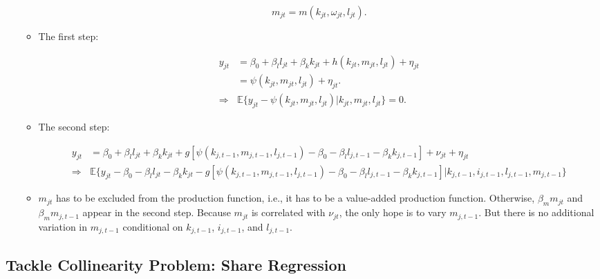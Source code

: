 \documentclass[]{book}
\theoremstyle{definition}
\theoremstyle{definition}
\theoremstyle{definition}
\theoremstyle{remark}
\begin{document}
\begin{enumerate}
\begin{itemize}
    \begin{equation}
    m_{jt} = m(k_{jt}, \omega_{jt}, l_{jt}).
    \end{equation}
  \item
    The first step:

    \begin{equation}
    \begin{split}
    y_{jt} &= \beta_0 + \beta_l l_{jt} + \beta_k k_{jt} + h(k_{jt}, m_{jt}, l_{jt}) + \eta_{jt}\\
    &= \psi(k_{jt}, m_{jt}, l_{jt}) + \eta_{jt}.\\
    \Rightarrow & \mathbb{E}\{y_{jt} - \psi(k_{jt}, m_{jt}, l_{jt})|k_{jt}, m_{jt}, l_{jt}\} = 0.
    \end{split}
    \end{equation}
  \item
    The second step:

    \begin{equation}
    \begin{split}
    y_{jt} &= \beta_0 + \beta_l l_{jt} + \beta_k k_{jt} + g[\psi(k_{j, t - 1}, m_{j, t - 1}, l_{j, t - 1}) - \beta_0 - \beta_l l_{j, t - 1} - \beta_k k_{j, t - 1}] + \nu_{jt} + \eta_{jt}\\
    \Rightarrow & \mathbb{E}\{y_{jt} - \beta_0 - \beta_l l_{jt} - \beta_k k_{jt} - g[\psi(k_{j, t - 1}, m_{j, t - 1}, l_{j, t - 1}) - \beta_0 - \beta_l l_{j, t - 1} - \beta_k k_{j, t - 1}]|k_{j, t - 1}, i_{j, t - 1}, l_{j, t - 1}, m_{j, t - 1}\}
    \end{split}
    \end{equation}
  \item
    \(m_{jt}\) has to be excluded from the production function, i.e., it
    has to be a value-added production function. Otherwise,
    \(\beta_m m_{jt}\) and \(\beta_m m_{j, t - 1}\) appear in the second
    step. Because \(m_{jt}\) is correlated with \(\nu_{jt}\), the only
    hope is to vary \(m_{j, t - 1}\). But there is no additional
    variation in \(m_{j, t - 1}\) conditional on \(k_{j, t - 1}\),
    \(i_{j, t - 1}\), and \(l_{j, t - 1}\).
  \end{itemize}
\end{enumerate}

\subsection{Tackle Collinearity Problem: Share
Regression}\label{tackle-collinearity-problem-share-regression}
\end{document}
